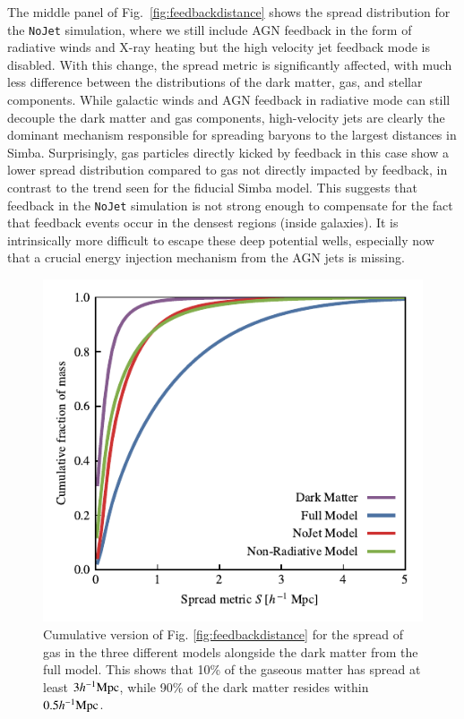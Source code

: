 \documentclass[fleqn,usenatbib]{mnras}
\newcommand{\hmpc}{h^{-1}{\rm Mpc}}
\newcommand{\simba}{{\sc Simba}}
\newcommand{\nojet}{{\tt NoJet}}
\begin{document}
The middle panel of Fig.~\ref{fig:feedbackdistance} shows the spread
distribution for the \nojet{} simulation, where we still include AGN feedback
in the form of radiative winds and X-ray heating but the high velocity jet
feedback mode is disabled. With this change, the spread metric is
significantly affected, with much less difference between the distributions
of the dark matter, gas, and stellar components. While galactic winds and AGN
feedback in radiative mode can still decouple the dark matter and gas
components, high-velocity jets are clearly the dominant mechanism responsible
for spreading baryons to the largest distances in \simba{}. Surprisingly, gas
particles directly kicked by feedback in this case show a lower spread
distribution compared to gas not directly impacted by feedback, in contrast
to the trend seen for the fiducial \simba{} model. This suggests that
feedback in the \nojet{} simulation is not strong enough to compensate for the
fact that feedback events occur in the densest regions (inside galaxies). It is
intrinsically more difficult to escape these deep potential wells, especially
now that a crucial energy injection mechanism from the AGN jets is missing.


\begin{figure}
    \centering
    \includegraphics{figures/cumulative_histogram_comparison.pdf}
    \vspace{-0.7cm}
    \caption{Cumulative version of Fig. \ref{fig:feedbackdistance} for the spread of gas
    in the three different models alongside the dark matter from the full model.
    This shows that 10\% of the gaseous matter has spread at least $3\hmpc{}$,
    while 90\% of the dark matter resides within $0.5 \hmpc{}$.}
    \label{fig:cumulativehistogram}
\end{figure}
\end{document}
